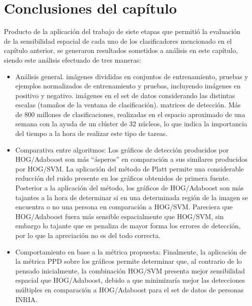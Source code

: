 \section{Conclusiones del capítulo}
\label{analisis:conclusiones}

Producto de la aplicación del trabajo de siete etapas que permitió la evaluación de la sensibilidad espacial de cada uno de los clasificadores mencionado en el capítulo anterior, se generaron resultados sometidos a análisis en este capítulo, siendo este análisis efectuado de tres maneras:
\begin{itemize}
\item Análisis general.
	 imágenes divididas en conjuntos de entrenamiento, pruebas y ejemplos normalizados de entrenamiento y pruebas, incluyendo imágenes en positivo y negativo.
	 imágenes en el set de datos considerando las distintas escalas (tamaños de la ventana de clasificación).
	 matrices de detección.
	\subitem  Más de 800 millones de clasificaciones, realizadas en el espacio aproximado de una semana con la ayuda de un clúster de 32 núcleos, lo que indica la importancia del tiempo a la hora de realizar este tipo de tareas.
\item Comparativa entre algoritmos:
	\subitem Los gráficos de detección producidos por HOG/Adaboost son más ``ásperos'' en comparación a sus similares producidos por HOG/SVM.
	\subitem  La aplicación del método de Platt permite una considerable reducción del ruido presente en los gráficos obtenidos de primera fuente.
	\subitem  Posterior a la aplicación del método, los gráficos de HOG/Adaboost son más tajantes a la hora de determinar si en una determinada región de la imagen se encuentra o no una persona en comparación a HOG/SVM. Pareciera que HOG/Adaboost fuera más sensible espacialmente que HOG/SVM, sin embargo lo tajante que es penaliza de mayor forma los errores de detección, por lo que la apreciación no es del todo correcta.
\item Comportamiento en base a la métrica propuesta: Finalmente, la aplicación de la métrica PPD sobre los gráficos permite determinar que, al contrario de lo pensado inicialmente, la combinación HOG/SVM presenta mejor sensibilidad espacial que HOG/Adaboost, debido a que minimizaría mejor las detecciones múltiples en comparación a HOG/Adaboost para el set de datos de personas INRIA.
\end{itemize}


